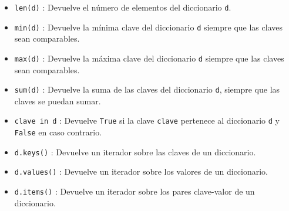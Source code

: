 \documentclass[
  spanish,
  a4paper,
]{scrreport}
\providecommand{\tightlist}{%
  \setlength{\itemsep}{0pt}\setlength{\parskip}{0pt}}
\begin{document}
\begin{itemize}
\tightlist
\item
  \texttt{len(d)} : Devuelve el número de elementos del diccionario
  \texttt{d}.
\item
  \texttt{min(d)} : Devuelve la mínima clave del diccionario \texttt{d}
  siempre que las claves sean comparables.
\item
  \texttt{max(d)} : Devuelve la máxima clave del diccionario \texttt{d}
  siempre que las claves sean comparables.
\item
  \texttt{sum(d)} : Devuelve la suma de las claves del diccionario
  \texttt{d}, siempre que las claves se puedan sumar.
\item
  \texttt{clave\ in\ d} : Devuelve \texttt{True} si la clave
  \texttt{clave} pertenece al diccionario \texttt{d} y \texttt{False} en
  caso contrario.
\item
  \texttt{d.keys()} : Devuelve un iterador sobre las claves de un
  diccionario.
\item
  \texttt{d.values()} : Devuelve un iterador sobre los valores de un
  diccionario.
\item
  \texttt{d.items()} : Devuelve un iterador sobre los pares clave-valor
  de un diccionario.
\end{itemize}
\end{document}
